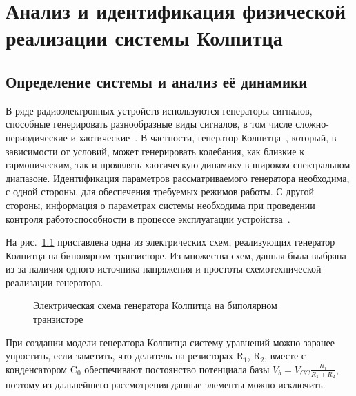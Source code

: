 \chapter{Анализ и идентификация физической реализации системы Колпитца}
\label{atu:ch:colpreal}


\section{Определение системы и анализ её динамики} %
\label{atu:s:colp_task}

В ряде радиоэлектронных устройств используются
генераторы сигналов, способные генерировать разнообразные виды  сигналов, в том числе
сложно-периодические и хаотические~\cite{dmitriev_gen_chaos}.
В частности, генератор  Колпитца~\cite{kennedy_chaos_colpitts,atu_asau21}, который, в
зависимости от условий,   может
генерировать  колебания,  как  близкие  к  гармоническим,  так  и  проявлять
хаотическую  динамику  в  широком  спектральном   диапазоне.   Идентификация
параметров рассматриваемого генератора  необходима,  с  одной  стороны,  для
обеспечения  требуемых  режимов  работы.  С  другой  стороны,  информация  о
параметрах системы необходима при проведении  контроля  работоспособности  в
процессе эксплуатации устройства~\cite{atu_apir2013}.

На рис.~\ref{atu:f:colp_schem} приставлена одна из электрических схем,
реализующих генератор Колпитца на биполярном транзисторе.
Из множества схем, данная была выбрана из-за наличия
одного источника напряжения и простоты схемотехнической реализации генератора.


\begin{figure}[htb!]
\begin{center}

\end{center}
\caption{Электрическая схема генератора Колпитца на биполярном транзисторе}
\label{atu:f:colp_schem}
\end{figure}

При создании модели генератора Колпитца систему уравнений можно
заранее упростить, если заметить, что
делитель на резисторах
$\mathrm{R}_1$, $\mathrm{R}_2$,
вместе с конденсатором
$\mathrm{C}_0$ обеспечивают
постоянство потенциала базы
$V_b = V_{CC} \frac{R_1}{R_1+R_2}$,
поэтому из дальнейшего рассмотрения данные элементы можно
исключить.

